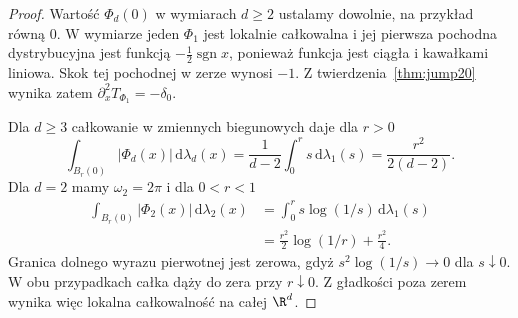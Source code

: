 \begin{proof}
Wartość $\Phi_d(0)$ w wymiarach $d\ge2$ ustalamy
dowolnie, na przykład równą $0$.
W wymiarze jeden $\Phi_1$ jest lokalnie całkowalna
i jej pierwsza pochodna dystrybucyjna jest funkcją
$-\tfrac12\operatorname{sgn}x$, ponieważ funkcja jest ciągła
i kawałkami liniowa. Skok tej pochodnej w zerze wynosi $-1$.
Z twierdzenia~\ref{thm:jump20} wynika zatem
$\partial_x^2T_{\Phi_1}=-\delta_0$.

Dla $d\ge3$ całkowanie w zmiennych biegunowych daje
dla $r>0$
\[
 \int_{B_r(0)}|\Phi_d(x)|\,\mathrm d\lambda_d(x)
 =\frac1{d-2}\int_0^r s\,\mathrm d\lambda_1(s)
 =\frac{r^2}{2(d-2)}.
\]
Dla $d=2$ mamy $\omega_2=2\pi$ i dla $0<r<1$
\[
 \begin{aligned}
 \int_{B_r(0)}|\Phi_2(x)|\,\mathrm d\lambda_2(x)
 &=\int_0^r s\log(1/s)\,\mathrm d\lambda_1(s)\\
 &=\frac{r^2}{2}\log(1/r)+\frac{r^2}{4}.
 \end{aligned}
\]
Granica dolnego wyrazu pierwotnej jest zerowa,
gdyż $s^2\log(1/s)\to0$ dla $s\downarrow0$.
W obu przypadkach całka dąży do zera przy $r\downarrow0$.
Z gładkości poza zerem wynika więc lokalna
całkowalność na całej $\R^d$.


\end{proof}
